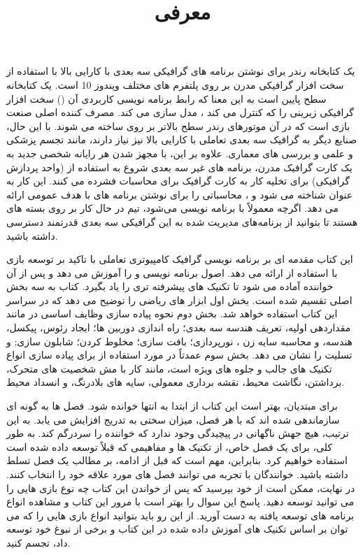     {
        \title{
            \center \Huge
            \textbf{معرفی}
            \\[25pt]
        }

        {\large
         یک کتابخانه رندر برای نوشتن برنامه های گرافیکی سه بعدی با کارایی بالا با استفاده از سخت افزار گرافیکی مدرن بر روی پلتفرم های مختلف ویندوز 10  است.
         یک کتابخانه سطح پایین است به این معنا که رابط برنامه نویسی کاربردی آن () سخت افزار گرافیکی زیرینی را که کنترل می کند ، مدل سازی می کند.
        مصرف کننده اصلی  صنعت بازی است که در آن موتورهای رندر سطح بالاتر بر روی  ساخته می شوند.
        با این حال، صنایع دیگر به گرافیک سه بعدی تعاملی با کارایی بالا نیز نیاز دارند، مانند تجسم پزشکی و علمی و بررسی های معماری.
        علاوه بر این، با مجهز شدن هر رایانه شخصی جدید به یک کارت گرافیک مدرن، برنامه های غیر سه بعدی شروع به استفاده از  (واحد پردازش گرافیکی) برای تخلیه کار به کارت گرافیک برای محاسبات فشرده می کنند.
        این کار به عنوان  شناخته می شود و  ،  محاسباتی را برای نوشتن برنامه های  با هدف عمومی ارائه می دهد.
        اگرچه  معمولاً با   برنامه نویسی می‌شود، تیم   در حال کار بر روی بسته های  هستند تا بتوانید از برنامه‌های مدیریت شده به این  گرافیکی سه بعدی قدرتمند دسترسی داشته باشید.

        این کتاب مقدمه ای بر برنامه نویسی گرافیک کامپیوتری تعاملی با تاکید بر توسعه بازی با استفاده از  ارائه می دهد. اصول برنامه نویسی  و  را آموزش می دهد و پس از آن خواننده آماده می شود تا تکنیک های پیشرفته تری را یاد بگیرد.
        کتاب به سه بخش اصلی تقسیم شده است. بخش اول ابزار های ریاضی را توضیح می دهد که در سراسر این کتاب استفاده خواهد شد.
        بخش دوم نحوه پیاده سازی وظایف اساسی در  مانند مقداردهی اولیه، تعریف هندسه سه بعدی؛ راه اندازی دوربین ها؛ ایجاد رئوس، پیکسل، هندسه، و محاسبه سایه زن ، نورپردازی؛ بافت سازی؛ مخلوط کردن؛ شابلون سازی; و تسلیت را نشان می دهد.
        بخش سوم عمدتاً در مورد استفاده از  برای پیاده سازی انواع تکنیک های جالب و جلوه های ویژه است، مانند کار با مش شخصیت های متحرک، برداشتن، نگاشت محیط، نقشه برداری معمولی، سایه های بلادرنگ، و انسداد محیط.

        برای مبتدیان، بهتر است این کتاب از ابتدا به انتها خوانده شود. فصل ها به گونه ای سازماندهی شده اند که با هر فصل، میزان سختی به تدریج افزایش می یابد. به این ترتیب، هیچ جهش ناگهانی در پیچیدگی وجود ندارد که خواننده را سردرگم کند.
        به طور کلی، برای یک فصل خاص، از تکنیک ها و مفاهیمی که قبلاً توسعه داده شده است استفاده خواهیم کرد. بنابراین، مهم است که قبل از ادامه، بر مطالب یک فصل تسلط داشته باشید.
        خوانندگان با تجربه می توانند فصل های مورد علاقه خود را انتخاب کنند. در نهایت، ممکن است از خود بپرسید که پس از خواندن این کتاب چه نوع بازی هایی را می توانید توسعه دهید. پاسخ این سوال را بهتر است با مرور این کتاب و مشاهده انواع برنامه های توسعه یافته به دست آورید. از این رو باید بتوانید انواع بازی هایی را که می توان بر اساس تکنیک های آموزش داده شده در این کتاب و برخی از نبوغ خود توسعه داد، تجسم کنید.

        }

    }
